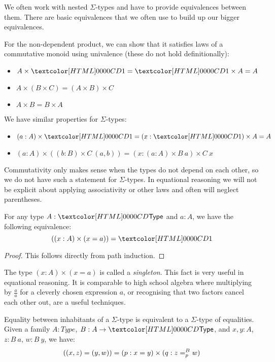 We often work with nested $\Sigma$-types and have to provide
equivalences between them. There are basic equivalences that we often
use to build up our bigger equivalences.

For the non-dependent product, we can show that it satisfies laws of a
commutative monoid using univalence (these do not hold
definitionally):
\begin{itemize}
\item $A \times \unitty = \unitty \times A = A$
\item $A \times (B \times C) = (A \times B) \times C$
\item $A \times B = B \times A$
\end{itemize}
We have similar properties for $\Sigma$-types:
\begin{itemize}
\item $(a : A) \times \unitty = (x : \unitty) \times A = A$
\item $(a : A) \times ((b : B) \times C\ (a , b)) = (x : (a : A) \times B\ a) \times C\ x$
\end{itemize}
Commutativity only makes sense when the types do not depend on
each other, so we do not have such a statement for $\Sigma$-types. In
equational reasoning we will not be explicit about applying
associativity or other laws and often will neglect parentheses.

\begin{proposition}
  For any type $A : \Type$ and $a : A$, we have the following
  equivalence:
  $$
  ((x : A) \times (x = a)) = \unitty
  $$
\end{proposition}

\begin{proof}
  This follows directly from path induction.
\end{proof}

The type $(x : A) \times (x = a)$ is called a \emph{singleton}. This
fact is very useful in equational reasoning. It is comparable to high
school algebra where multiplying by $\frac{a}{a}$ for a cleverly
chosen expression $a$, or recognising that two factors cancel
each other out, are a useful techniques.

\begin{proposition}
  Equality between inhabitants of a $\Sigma$-type is equivalent to a
  $\Sigma$-type of equalities. Given a family $A : Type$,
  $B : A \to \Type$, and $x , y : A$, $z : B\ a$, $w : B\ y$, we have:
  $$
  ((x , z) = (y , w)) = (p : x = y) \times (q : \pathover{B}{p}{z}{w})
  $$
\end{proposition}

